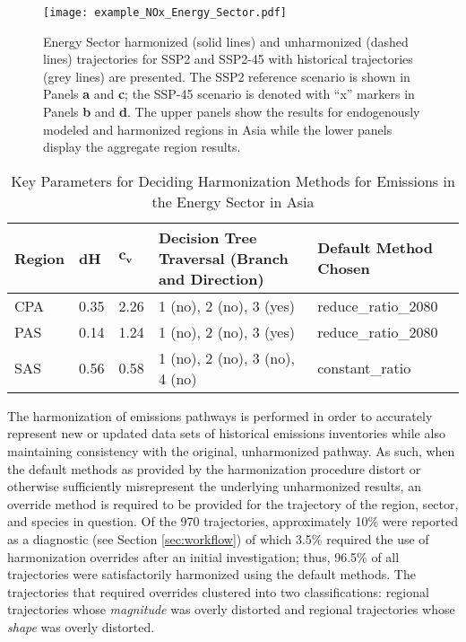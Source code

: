 \begin{figure}
  \begin{center}
    \texttt{[image: example\_NOx\_Energy\_Sector.pdf]}
    \caption[]{
      \label{fig:nox}
      \noxx Energy Sector harmonized (solid lines) and unharmonized (dashed lines)
      trajectories for SSP2 and SSP2-45 with historical trajectories (grey
      lines) are presented. The SSP2 reference scenario is shown in Panels
      \textbf{a} and \textbf{c}; the SSP-45 scenario is denoted with ``x''
      markers in Panels \textbf{b} and \textbf{d}. The upper panels show the
      results for endogenously modeled and harmonized regions in Asia while the
      lower panels display the aggregate region results.  
    }
  \end{center}
\end{figure}

\begin{table}[]
\centering
\caption{Key Parameters for Deciding Harmonization Methods for \noxx Emissions in the Energy Sector in Asia}
\label{tab:nox}
\begin{tabular}{|p{1.2cm}|p{.5cm}|p{.5cm}|p{4.5cm}|p{3cm}|}
\hline
\textbf{Region} & \textbf{dH} & $\mathbf{c_v}$ & \textbf{Decision Tree Traversal (Branch and Direction)} & \textbf{Default Method Chosen} \\ \hline
    \hline
CPA             & 0.35        & 2.26          & 1 (no), 2 (no), 3 (yes)                                 & reduce\_ratio\_2080    \\ \hline
PAS             & 0.14        & 1.24          & 1 (no), 2 (no), 3 (yes)                                 & reduce\_ratio\_2080    \\ \hline
SAS             & 0.56        & 0.58          & 1 (no), 2 (no), 3 (no), 4 (no)                          & constant\_ratio        \\ \hline
\end{tabular}
\end{table}

The harmonization of emissions pathways is performed in order to accurately
represent new or updated data sets of historical emissions inventories while also
maintaining consistency with the original, unharmonized pathway. As such, when
the default methods as provided by the harmonization procedure distort or
otherwise sufficiently misrepresent the underlying unharmonized results, an
override method is required to be provided for the trajectory of the region,
sector, and species in question. Of the 970 trajectories, approximately 10\%
were reported as a diagnostic (see Section \ref{sec:workflow}) of which 3.5\%
required the use of harmonization overrides after an initial investigation;
thus, 96.5\% of all trajectories were satisfactorily harmonized using the
default methods. The trajectories that required overrides clustered into two
classifications: regional trajectories whose \textit{magnitude} was overly
distorted and regional trajectories whose \textit{shape} was overly distorted.

